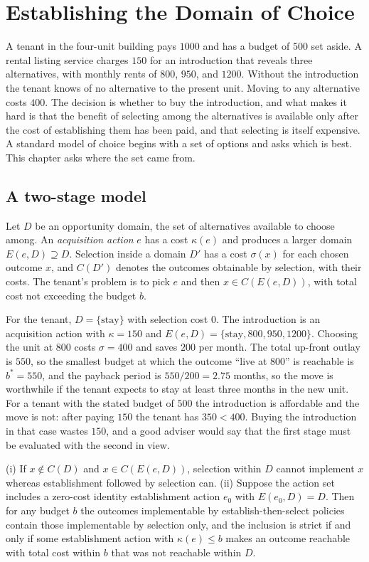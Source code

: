 \chapter{Establishing the Domain of Choice}\label{ch:4}

A tenant in the four-unit building pays $1000$ and has a budget of $500$ set aside. A rental listing service charges $150$ for an introduction that reveals three alternatives, with monthly rents of $800$, $950$, and $1200$. Without the introduction the tenant knows of no alternative to the present unit. Moving to any alternative costs $400$. The decision is whether to buy the introduction, and what makes it hard is that the benefit of selecting among the alternatives is available only after the cost of establishing them has been paid, and that selecting is itself expensive. A standard model of choice begins with a set of options and asks which is best. This chapter asks where the set came from.

\section{A two-stage model}

Let $D$ be an opportunity domain, the set of alternatives available to choose among. An \emph{acquisition action} $e$ has a cost $\kappa(e)$ and produces a larger domain $E(e,D)\supseteq D$. Selection inside a domain $D'$ has a cost $\sigma(x)$ for each chosen outcome $x$, and $C(D')$ denotes the outcomes obtainable by selection, with their costs. The tenant's problem is to pick $e$ and then $x\in C(E(e,D))$, with total cost not exceeding the budget $b$.

For the tenant, $D=\{\text{stay}\}$ with selection cost $0$. The introduction is an acquisition action with $\kappa=150$ and $E(e,D)=\{\text{stay},800,950,1200\}$. Choosing the unit at $800$ costs $\sigma=400$ and saves $200$ per month. The total up-front outlay is $550$, so the smallest budget at which the outcome ``live at $800$'' is reachable is $b^*=550$, and the payback period is $550/200=2.75$ months, so the move is worthwhile if the tenant expects to stay at least three months in the new unit. For a tenant with the stated budget of $500$ the introduction is affordable and the move is not: after paying $150$ the tenant has $350<400$. Buying the introduction in that case wastes $150$, and a good adviser would say that the first stage must be evaluated with the second in view.

\begin{theorem}\label{thm:P02}
(i) If $x\notin C(D)$ and $x\in C(E(e,D))$, selection within $D$ cannot implement $x$ whereas establishment followed by selection can. (ii) Suppose the action set includes a zero-cost identity establishment action $e_0$ with $E(e_0,D)=D$. Then for any budget $b$ the outcomes implementable by establish-then-select policies contain those implementable by selection only, and the inclusion is strict if and only if some establishment action with $\kappa(e)\le b$ makes an outcome reachable with total cost within $b$ that was not reachable within $D$.
\end{theorem}

